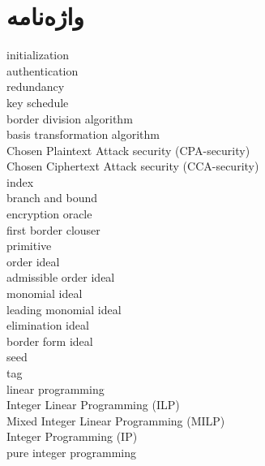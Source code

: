 \chapter*{واژه‌نامه}
\begin{latin}
initialization\dotfill {}\\
authentication\dotfill {}\\
redundancy\dotfill {}\\
key schedule\dotfill {}\\
border division algorithm\dotfill {}\\
basis transformation algorithm\dotfill {}\\
Chosen Plaintext Attack security (CPA-security)\dotfill {}\\
Chosen Ciphertext Attack security (CCA-security)\dotfill {}\\
index\dotfill {}\\
branch and bound\dotfill {}\\
encryption oracle\dotfill {}\\
first border clouser\dotfill {}\\
primitive\dotfill {}\\
order ideal\dotfill {}\\
admissible order ideal\dotfill {}\\
monomial ideal\dotfill {}\\
leading monomial ideal\dotfill {}\\
elimination ideal\dotfill {}\\
border form ideal\dotfill {}\\
seed\dotfill {}\\
tag\dotfill {}\\
linear programming\dotfill {}\\
Integer Linear Programming (ILP)\dotfill {}\\
Mixed Integer Linear Programming (MILP)\dotfill {}\\
Integer Programming (IP)\dotfill {}\\
pure integer programming\dotfill {}\\

\end{latin}
